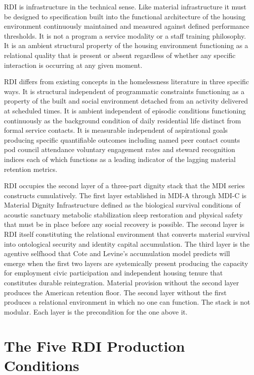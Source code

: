 \documentclass[12pt, letterpaper]{article}
\begin{document}
RDI is infrastructure in the technical sense. Like material infrastructure it must be designed to specification built into the functional architecture of the housing environment continuously maintained and measured against defined performance thresholds. It is not a program a service modality or a staff training philosophy. It is an ambient structural property of the housing environment functioning as a relational quality that is present or absent regardless of whether any specific interaction is occurring at any given moment.

RDI differs from existing concepts in the homelessness literature in three specific ways. It is structural independent of programmatic constraints functioning as a property of the built and social environment detached from an activity delivered at scheduled times. It is ambient independent of episodic conditions functioning continuously as the background condition of daily residential life distinct from formal service contacts. It is measurable independent of aspirational goals producing specific quantifiable outcomes including named peer contact counts pod council attendance voluntary engagement rates and steward recognition indices each of which functions as a leading indicator of the lagging material retention metrics.

RDI occupies the second layer of a three-part dignity stack that the MDI series constructs cumulatively. The first layer established in MDI-A through MDI-C is Material Dignity Infrastructure defined as the biological survival conditions of acoustic sanctuary metabolic stabilization sleep restoration and physical safety that must be in place before any social recovery is possible. The second layer is RDI itself constituting the relational environment that converts material survival into ontological security and identity capital accumulation. The third layer is the agentive selfhood that Cote and Levine's accumulation model \citep{cote_levine_2002} predicts will emerge when the first two layers are systemically present producing the capacity for employment civic participation and independent housing tenure that constitutes durable reintegration. Material provision without the second layer produces the American retention floor. The second layer without the first produces a relational environment in which no one can function. The stack is not modular. Each layer is the precondition for the one above it.

\clearpage
\section{The Five RDI Production Conditions}
\end{document}
